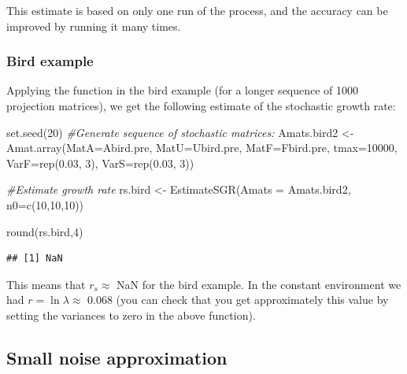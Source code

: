 \documentclass[
]{book}
\newenvironment{Shaded}{\begin{snugshade}}{\end{snugshade}}
\newcommand{\AttributeTok}[1]{\textcolor[rgb]{0.77,0.63,0.00}{#1}}
\newcommand{\CommentTok}[1]{\textcolor[rgb]{0.56,0.35,0.01}{\textit{#1}}}
\newcommand{\DecValTok}[1]{\textcolor[rgb]{0.00,0.00,0.81}{#1}}
\newcommand{\FloatTok}[1]{\textcolor[rgb]{0.00,0.00,0.81}{#1}}
\newcommand{\FunctionTok}[1]{\textcolor[rgb]{0.00,0.00,0.00}{#1}}
\newcommand{\NormalTok}[1]{#1}
\newcommand{\OtherTok}[1]{\textcolor[rgb]{0.56,0.35,0.01}{#1}}
\begin{document}
This estimate is based on only one run of the process, and the accuracy can be improved by running it many times.

\hypertarget{bird-example-20}{%
\subsubsection*{Bird example}\label{bird-example-20}}

Applying the function in the bird example (for a longer sequence of 1000 projection matrices), we get the following estimate of the stochastic growth rate:

\begin{Shaded}
\begin{Highlighting}[]
\FunctionTok{set.seed}\NormalTok{(}\DecValTok{20}\NormalTok{)}
\CommentTok{\#Generate sequence of stochastic matrices:}
\NormalTok{Amats.bird2 }\OtherTok{\textless{}{-}} \FunctionTok{Amat.array}\NormalTok{(}\AttributeTok{MatA=}\NormalTok{Abird.pre, }\AttributeTok{MatU=}\NormalTok{Ubird.pre, }\AttributeTok{MatF=}\NormalTok{Fbird.pre, }\AttributeTok{tmax=}\DecValTok{10000}\NormalTok{, }\AttributeTok{VarF=}\FunctionTok{rep}\NormalTok{(}\FloatTok{0.03}\NormalTok{, }\DecValTok{3}\NormalTok{), }\AttributeTok{VarS=}\FunctionTok{rep}\NormalTok{(}\FloatTok{0.03}\NormalTok{, }\DecValTok{3}\NormalTok{)) }

\CommentTok{\#Estimate growth rate}
\NormalTok{rs.bird }\OtherTok{\textless{}{-}} \FunctionTok{EstimateSGR}\NormalTok{(}\AttributeTok{Amats =}\NormalTok{ Amats.bird2, }\AttributeTok{n0=}\FunctionTok{c}\NormalTok{(}\DecValTok{10}\NormalTok{,}\DecValTok{10}\NormalTok{,}\DecValTok{10}\NormalTok{))}

\FunctionTok{round}\NormalTok{(rs.bird,}\DecValTok{4}\NormalTok{)}
\end{Highlighting}
\end{Shaded}

\begin{verbatim}
## [1] NaN
\end{verbatim}

This means that \(r_s\approx\) NaN for the bird example. In the constant environment we had \(r= \ln\lambda\approx\) 0.068 (you can check that you get approximately this value by setting the variances to zero in the above function).

\hypertarget{small-noise-approximation}{%
\subsection{Small noise approximation}\label{small-noise-approximation}}
\end{document}

